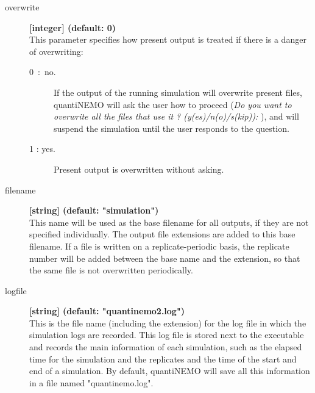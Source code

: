 \documentclass[letterpaper,12pt,oneside]{book}
\begin{document}
\begin{description}
\item[overwrite]\textbf{[integer] (default: 0)}\\
This parameter specifies how present output is treated if there is a danger of overwriting:
\begin{description}
\item[0~:~no.] If the output of the running simulation will overwrite present files, quantiNEMO will ask the user how to proceed (\textit{Do you want to overwrite all the files that use it ? (y(es)/n(o)/s(kip)):} ), and will suspend the simulation until the user responds to the question.
\item[1 : yes.] Present output is overwritten without asking.	
\end{description}


\item[filename]\textbf{[string] (default: "simulation")}\\
This name will be used as the base filename for all outputs, if they are not specified individually. The output file extensions are added to this base filename. If a file is written on a replicate-periodic basis, the replicate number will be added between the base name and the extension, so that the same file is not overwritten periodically.  


\item[logfile] \textbf{[string] (default: "quantinemo2.log")}\\
This is the file name (including the extension) for the log file in which the simulation logs are recorded. This log file is stored next to the executable and records the main information of each simulation, such as the elapsed time for the simulation and the replicates and the time of the start and end of a simulation. By default, quantiNEMO will save all this information in a file named "quantinemo.log".


\end{description}
\end{document}

